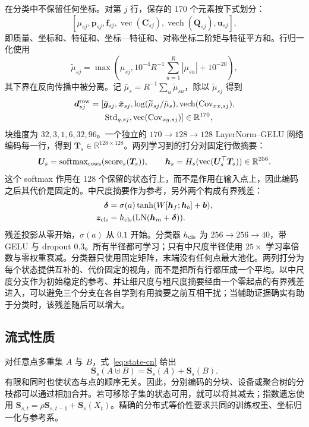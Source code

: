 \documentclass[UTF8,a4paper,11pt,fontset=windows]{ctexart}
\newcommand{\R}{\mathbb{R}}
\newcommand{\Sstate}{\mathbf{S}}
\newcommand{\vect}{\operatorname{vec}}
\begin{document}
在分类中不保留任何坐标。对第 $j$ 行，保存的 170 个元素按下式划分：
\[
[\mu_{sj},\bm p_{sj},\bm f_{sj},\vect(\bm C_{sj}),
\operatorname{vech}(\bm Q_{sj}),\bm u_{sj}],
\]
即质量、坐标和、特征和、坐标—特征和、对称坐标二阶矩与特征平方和。行归一化使用
\begin{equation}
\widetilde\mu_{sj}=\max\!\left(
\mu_{sj},10^{-4}R^{-1}\sum_{u=1}^{R}|\mu_{su}|+10^{-20}\right),
\label{eq:cls-floor-cn}
\end{equation}
其下界在反向传播中被分离。记 $\bar\mu_s=R^{-1}\sum_u\widetilde\mu_{su}$，除以 $\widetilde\mu_{sj}$ 得到
\begin{equation}
\begin{aligned}
\bm d^{\rm row}_{sj}=[&
\bar{\bm g}_{sj},\bar{\bm x}_{sj},
\log(\widetilde\mu_{sj}/\bar\mu_s),
\operatorname{vech}(\operatorname{Cov}_{xx,sj}),\\
&\operatorname{Std}_{g,sj},
\vect(\operatorname{Cov}_{xg,sj})]\in\R^{170},
\end{aligned}
\label{eq:cls-descriptor-cn}
\end{equation}
块维度为 $32,3,1,6,32,96$。一个独立的 $170\rightarrow128\rightarrow128$ LayerNorm--GELU 网络编码每一行，得到 $\bm T_s\in\R^{128\times128}$。两列学习到的打分对固定行做摘要：
\begin{equation}
\bm U_s=\operatorname{softmax}_{\rm rows}(\operatorname{score}_s(\bm T_s)),\qquad
\bm h_s=H_s(\vect(\bm U_s^\top\bm T_s))\in\R^{256}.
\label{eq:state-summary-cn}
\end{equation}
这个 softmax 作用在 128 个保留的状态行上，而不是作用在输入点上，因此编码之后其代价是固定的。中尺度摘要作为参考，另外两个构成有界残差：
\begin{align}
\bm\delta&=\sigma(a)\tanh(W[\bm h_f;\bm h_b]+\bm b),\nonumber\\
\bm z_{\rm cls}&=h_{\rm cls}(\operatorname{LN}(\bm h_m+\bm\delta)).
\label{eq:cls-cn}
\end{align}
残差投影从零开始，$\sigma(a)$ 从 $0.1$ 开始。分类器 $h_{\rm cls}$ 为 $256\rightarrow256\rightarrow40$，带 GELU 与 dropout $0.3$。所有半径都可学习；只有中尺度半径使用 $25\times$ 学习率倍数与零权重衰减。分类器只使用固定矩阵，末端没有任何点最大池化。两列打分为每个状态提供互补的、代价固定的视角，而不是把所有行都压成一个平均。以中尺度分支作为初始稳定的参考、并让细尺度与粗尺度摘要经由一个零起点的有界残差进入，可以避免三个分支在各自学到有用摘要之前互相干扰；当辅助证据确实有助于分类时，该残差随后可以增大。

\subsection{流式性质}
对任意点多重集 $A$ 与 $B$，式~\eqref{eq:state-cn} 给出
\begin{equation}
\Sstate_s(A\uplus B)=\Sstate_s(A)+\Sstate_s(B).
\label{eq:add-cn}
\end{equation}
有限和同时也使状态与点的顺序无关。因此，分别编码的分块、设备或聚合树的分枝都可以通过相加合并。若可移除子集的状态可用，就可以将其减去；指数遗忘使用 $\Sstate_{s,t}=\rho\Sstate_{s,t-1}+\Sstate_s(X_t)$。精确的分布式等价性要求共同的训练权重、坐标归一化与参考系。
\end{document}
